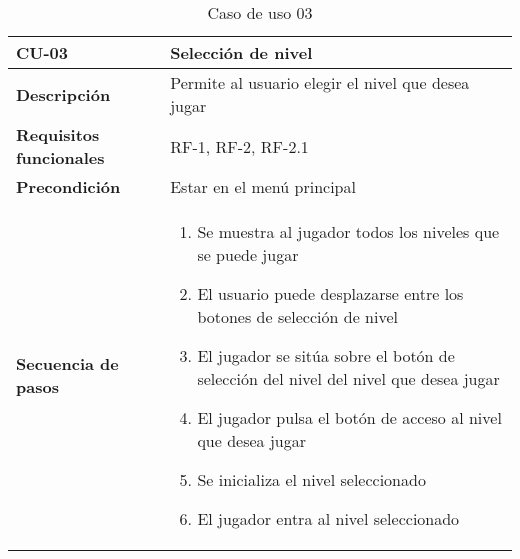 \begin{longtable}{l|l}
\caption{Caso de uso 03}\\
\begin{minipage}{0.25\columnwidth}
\textbf{CU-03} 
\end{minipage}
&
\begin{minipage}{0.65\columnwidth}
Selección de nivel
\end{minipage}
\\ \hline

\begin{minipage}{0.25\columnwidth}
\textbf{Descripción} 
\end{minipage}
&
\begin{minipage}{0.65\columnwidth}
Permite al usuario elegir el nivel que desea jugar
\end{minipage}
\\ \hline

\begin{minipage}{0.25\columnwidth}
\textbf{Requisitos funcionales} 
\end{minipage}
&
\begin{minipage}{0.65\columnwidth}
RF-1, RF-2, RF-2.1
\end{minipage}
\\ \hline

\begin{minipage}{0.25\columnwidth}
\textbf{Precondición} 
\end{minipage}
&
\begin{minipage}{0.65\columnwidth}
Estar en el menú principal
\end{minipage}
\\ \hline

\begin{minipage}{0.25\columnwidth}
\textbf{Secuencia de pasos} 
\end{minipage}
&
\begin{minipage}{0.65\columnwidth}
\begin{enumerate}
\item
Se muestra al jugador todos los niveles que se puede jugar
\item
El usuario puede desplazarse entre los botones de selección de nivel
\item
El jugador se sitúa sobre el botón de selección del nivel del nivel que desea jugar
\item
El jugador pulsa el botón de acceso al nivel que desea jugar
\item
Se inicializa el nivel seleccionado
\item
El jugador entra al nivel seleccionado
\end{enumerate}
\end{minipage}
\\ \hline


\end{longtable}
